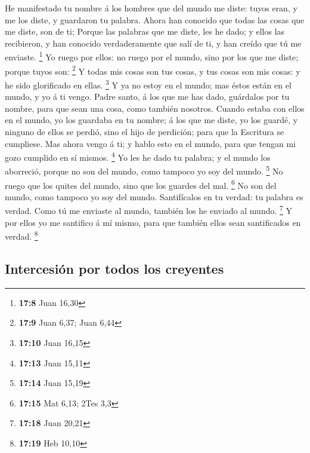  He manifestado tu nombre á los hombres que del mundo me
diste: tuyos eran, y me los diste, y guardaron tu palabra. 
Ahora han conocido que todas las cosas que me diste, son de ti;
 Porque las palabras que me diste, les he dado; y ellos las
recibieron, y han conocido verdaderamente que salí de ti, y han creído
que tú me enviaste. \footnote{\textbf{17:8} Juan 16,30}  Yo
ruego por ellos: no ruego por el mundo, sino por los que me diste;
porque tuyos son: \footnote{\textbf{17:9} Juan 6,37; Juan 6,44}
 Y todas mis cosas son tus cosas, y tus cosas son mis
cosas: y he sido glorificado en ellas. \footnote{\textbf{17:10} Juan
  16,15}  Y ya no estoy en el mundo; mas éstos están en el
mundo, y yo á ti vengo. Padre santo, á los que me has dado, guárdalos
por tu nombre, para que sean una cosa, como también nosotros.
 Cuando estaba con ellos en el mundo, yo los guardaba en tu
nombre; á los que me diste, yo los guardé, y ninguno de ellos se perdió,
sino el hijo de perdición; para que la Escritura se cumpliese.
 Mas ahora vengo á ti; y hablo esto en el mundo, para que
tengan mi gozo cumplido en sí mismos. \footnote{\textbf{17:13} Juan
  15,11}  Yo les he dado tu palabra; y el mundo los
aborreció, porque no son del mundo, como tampoco yo soy del mundo.
\footnote{\textbf{17:14} Juan 15,19}  No ruego que los
quites del mundo, sino que los guardes del mal. \footnote{\textbf{17:15}
  Mat 6,13; 2Tes 3,3}  No son del mundo, como tampoco yo
soy del mundo.  Santifícalos en tu verdad: tu palabra es
verdad.  Como tú me enviaste al mundo, también los he
enviado al mundo. \footnote{\textbf{17:18} Juan 20,21}  Y
por ellos yo me santifico á mí mismo, para que también ellos sean
santificados en verdad. \footnote{\textbf{17:19} Heb 10,10}

\hypertarget{intercesiuxf3n-por-todos-los-creyentes}{%
\subsection{Intercesión por todos los
creyentes}\label{intercesiuxf3n-por-todos-los-creyentes}}

